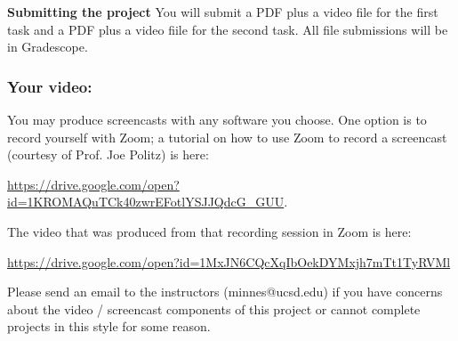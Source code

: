 \documentclass[12pt, oneside]{article}
\begin{document}
{\bf Submitting the project} You will submit a PDF plus a video file for the first task and a PDF plus a video fiile for the 
second task. All file submissions will be in Gradescope.

\newpage
\subsubsection*{Your video:} You may produce screencasts 
with any software you choose. 
One option is to record yourself with Zoom; a tutorial on how to use 
Zoom to record a 
screencast (courtesy of Prof. Joe Politz)  is here: 

\url{https://drive.google.com/open?id=1KROMAQuTCk40zwrEFotlYSJJQdcG_GUU}.

The video that was produced from that recording session in Zoom is here:

\url{https://drive.google.com/open?id=1MxJN6CQcXqIbOekDYMxjh7mTt1TyRVMl}

Please send an email to the instructors 
(minnes@ucsd.edu) if you have 
concerns about  the video / screencast components of this project or 
cannot complete projects in this style for some reason.
\end{document}
